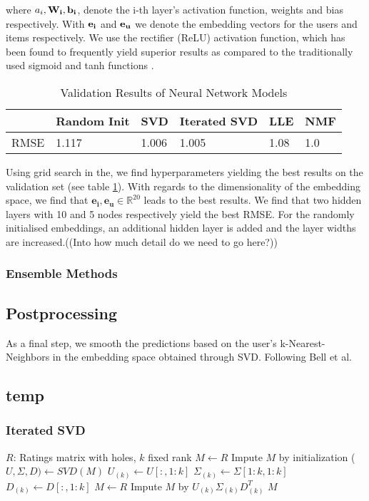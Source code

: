 \documentclass[10pt,conference,compsocconf]{IEEEtran}
\begin{document}
where $a_i,\bf{W_i}, \bf{b_i}$, denote the i-th layer's activation function, weights and bias respectively. With $\bf{e_i}$ and $\bf{e_u}$ we denote the embedding vectors for the users and items respectively. We use the rectifier (ReLU) activation function, which has been found to frequently yield superior results as compared to the traditionally used sigmoid and tanh functions \cite{glorot2011deep}.


\begin{table}[]
\centering
\caption{Validation Results of Neural Network Models}
\label{table:neural_net_models}
\begin{tabular}{|l|l|l|l|l|l|}
\hline
     & Random Init & SVD & Iterated SVD & LLE & NMF \\ \hline
RMSE & 1.117           & 1.006   & 1.005           & 1.08   & 1.0   \\ \hline
\end{tabular}
\end{table}

Using grid search in the, we find hyperparameters yielding the best results on the validation set (see table \ref{table:neural_net_models}). 
With regards to the dimensionality of the embedding space, we find that $\mathbf{e_i}, \mathbf{e_u} \in  \mathbb{R}^{20}$ leads to the best results. We find that two hidden layers with 10 and 5 nodes respectively yield the best RMSE. For the randomly initialised embeddings, an additional hidden layer is added and the layer widths are increased.((Into how much detail do we need to go here?))




\subsubsection{Ensemble Methods}

\subsection{Postprocessing}
As a final step, we smooth the predictions based on the user's  k-Nearest-Neighbors in the embedding space obtained through SVD. Following Bell et al. \cite{bell2007improved}

\subsection{temp}
\subsubsection{Iterated SVD}
\begin{algorithmic}
	\STATE $R$: Ratings matrix with holes, $k$ fixed rank
	\STATE $M \leftarrow R$
	\STATE Impute $M$ by initialization
    	\STATE ($U, \Sigma, D) \leftarrow SVD(M)$
    	\STATE $U_{(k)} \leftarrow U[:, 1:k]$
    	\STATE $\Sigma_{(k)} \leftarrow \Sigma[1:k, 1:k]$
    	\STATE $D_{(k)} \leftarrow D[:, 1:k]$
    	\STATE $M \leftarrow R$
    	\STATE Impute $M$ by $U_{(k)} \Sigma_{(k)} D_{(k)}^T$
    \ENDFOR
    \RETURN $M$
\end{algorithmic}
\end{document}
